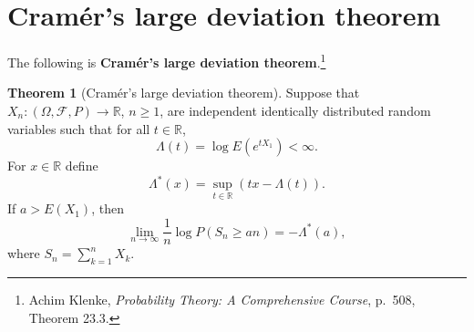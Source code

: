 \documentclass{article}
\theoremstyle{definition}
\newtheorem{theorem}{Theorem}
\theoremstyle{definition}
\begin{document}
\section{Cram\'er's large deviation theorem}

The following is \textbf{Cram\'er's large deviation theorem}.\footnote{Achim Klenke, {\em Probability Theory: A Comprehensive Course},
p.~508, Theorem 23.3.}


\begin{theorem}[Cram\'er's  large deviation theorem]
Suppose that $X_n:(\Omega,\mathscr{F},P) \to \mathbb{R}$, $n \geq 1$, are independent identically
distributed random variables such that for all $t \in \mathbb{R}$,
\[
\Lambda(t) = \log E(e^{tX_1})<\infty.
\]
For $x \in \mathbb{R}$ define
\[
\Lambda^*(x) = \sup_{t \in \mathbb{R}} (tx-\Lambda(t)).
\]
If $a>E(X_1)$, then
\[
\lim_{n \to \infty} \frac{1}{n} \log P(S_n \geq an) = -\Lambda^*(a),
\]
where $S_n = \sum_{k=1}^n X_k$. 
\end{theorem}
\end{document}
